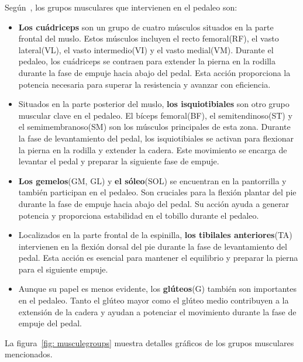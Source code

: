 Según~\cite{Losmúscu21}, los grupos musculares que intervienen en el pedaleo son:
\begin{itemize}
    \item \textbf{Los cuádriceps} son un grupo de cuatro músculos situados en la parte frontal del muslo. Estos músculos incluyen el recto femoral(RF), el vasto lateral(VL), el vasto intermedio(VI) y el vasto medial(VM). Durante el pedaleo, los cuádriceps se contraen para extender la pierna en la rodilla durante la fase de empuje hacia abajo del pedal. Esta acción proporciona la potencia necesaria para superar la resistencia y avanzar con eficiencia.
    
    \item Situados en la parte posterior del muslo, \textbf{los isquiotibiales} son otro grupo muscular clave en el pedaleo. El bíceps femoral(BF), el semitendinoso(ST) y el semimembranoso(SM) son los músculos principales de esta zona. Durante la fase de levantamiento del pedal, los isquiotibiales se activan para flexionar la pierna en la rodilla y extender la cadera. Este movimiento se encarga de levantar el pedal y preparar la siguiente fase de empuje.
    
    \item \textbf{Los gemelos}(GM, GL) y \textbf{el sóleo}(SOL) se encuentran en la pantorrilla y también participan en el pedaleo. Son cruciales para la flexión plantar del pie durante la fase de empuje hacia abajo del pedal. Su acción ayuda a generar potencia y proporciona estabilidad en el tobillo durante el pedaleo.
    
    \item Localizados en la parte frontal de la espinilla, \textbf{los tibilales anteriores}(TA) intervienen en la flexión dorsal del pie durante la fase de levantamiento del pedal. Esta acción es esencial para mantener el equilibrio y preparar la pierna para el siguiente empuje.
    
    \item Aunque su papel es menos evidente, los \textbf{glúteos}(G) también son importantes en el pedaleo. Tanto el glúteo mayor como el glúteo medio contribuyen a la extensión de la cadera y ayudan a potenciar el movimiento durante la fase de empuje del pedal.
\end{itemize}

La figura~\ref{fig: musculegroups} muestra detalles gráficos de los grupos musculares mencionados.

